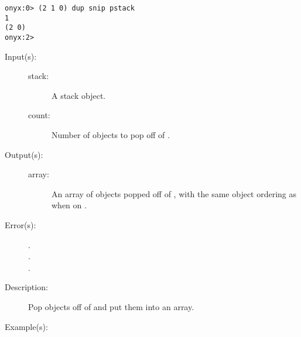 \begin{description}
\begin{description}
\begin{verbatim}
onyx:0> (2 1 0) dup snip pstack
1
(2 0)
onyx:2>
		\end{verbatim}
	\end{description}
\label{systemdict:snpop}
\item[{\onyxop{stack count}{snpop}{array}}: ]
	\begin{description}\item[]
	\item[Input(s): ]
		\begin{description}\item[]
		\item[stack: ]
			A stack object.
		\item[count: ]
			Number of objects to pop off of .
		\end{description}
	\item[Output(s): ]
		\begin{description}\item[]
		\item[array: ]
			An array of objects popped off of , with
			the same object ordering as when on .
		\end{description}
	\item[Error(s): ]
		\begin{description}\item[]
		\item[.]
		\item[.]
		\item[.]
		\end{description}
	\item[Description: ]
		Pop  objects off of  and put them into
		an array.
	\item[Example(s): ]\begin{verbatim}


\end{verbatim}
\end{description}
\end{description}
